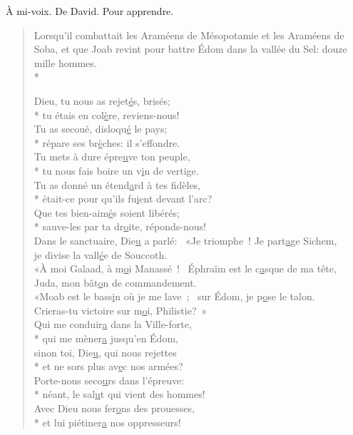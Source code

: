 À mi-voix. De David. Pour apprendre. \\

\begin{verse}
Lorsqu’il combattait les Araméens de Mésopotamie et les Araméens de Soba, et que Joab revint pour battre Édom dans la vallée du Sel: douze mille hommes. \\*

Dieu, tu nous as rejet\underline{é}s, brisés; \\*
tu étais en col\underline{è}re, reviens-nous! \\
Tu as secoué, disloqu\underline{é} le pays; \\*
répare ses br\underline{è}ches: il s’effondre. \\

Tu mets à dure épre\underline{u}ve ton peuple, \\*
tu nous fais boire un v\underline{i}n de vertige. \\
Tu as donné un étend\underline{a}rd à tes fidèles, \\*
était-ce pour qu’ils fu\underline{i}ent devant l’arc? \\

Que tes bien-aim\underline{é}s soient libérés; \\*
sauve-les par ta dr\underline{o}ite, réponds-nous! \\

Dans le sanctuaire, Die\underline{u} a parlé:~\psalmdagger
«Je triomphe ! Je part\underline{a}ge Sichem, \\
je divise la vall\underline{é}e de Souccoth. \\

«À moi Galaad, à m\underline{o}i Manassé !~\psalmdagger
Éphraïm est le c\underline{a}sque de ma tête, \\
Juda, mon bât\underline{o}n de commandement. \\

«Moab est le bass\underline{i}n où je me lave ;~\psalmdagger
sur Édom, je p\underline{o}se le talon. \\
Crieras-tu victoire sur m\underline{o}i, Philistie? » \\

Qui me conduir\underline{a} dans la Ville-forte, \\*
qui me mèner\underline{a} jusqu’en Édom, \\
sinon toi, Die\underline{u}, qui nous rejettes \\*
et ne sors plus av\underline{e}c nos armées? \\

Porte-nous seco\underline{u}rs dans l’épreuve: \\*
néant, le sal\underline{u}t qui vient des hommes! \\
Avec Dieu nous fer\underline{o}ns des prouesses, \\*
et lui piétiner\underline{a} nos oppresseurs! \\
\end{verse}

